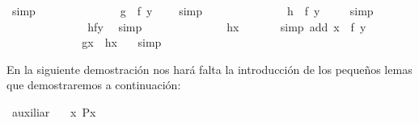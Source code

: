 \begin{isabellebody}
\ simp\isanewline
\ \ \ \ \ \ \ \ \isamarkupfalse%
\ \isamarkupfalse%
\ \ {\isachardoublequoteopen}{\isachardot}{\isachardot}{\isachardot}\ {\isacharequal}\ {\isacharparenleft}g\ {\isasymcirc}\ f{\isacharparenright}\ {\isacharparenleft}y{\isacharparenright}\ \ {\isachardoublequoteclose}\ \isamarkupfalse%
\ simp\isanewline
\ \ \ \ \ \ \ \ \isamarkupfalse%
\ \isamarkupfalse%
\ \ {\isachardoublequoteopen}{\isachardot}{\isachardot}{\isachardot}\ {\isacharequal}\ {\isacharparenleft}h\ {\isasymcirc}\ f{\isacharparenright}\ {\isacharparenleft}y{\isacharparenright}{\isachardoublequoteclose}\ \isamarkupfalse%
\ {}\ \isamarkupfalse%
\ simp\isanewline
\ \ \ \ \ \ \ \ \isamarkupfalse%
\ \isamarkupfalse%
\ \ {\isachardoublequoteopen}{\isachardot}{\isachardot}{\isachardot}\ {\isacharequal}\ h{\isacharparenleft}f{\isacharparenleft}y{\isacharparenright}{\isacharparenright}{\isachardoublequoteclose}\ \isamarkupfalse%
\ simp\isanewline
\ \ \ \ \ \ \ \ \isamarkupfalse%
\ \isamarkupfalse%
\ \ {\isachardoublequoteopen}{\isachardot}{\isachardot}{\isachardot}\ {\isacharequal}\ h{\isacharparenleft}x{\isacharparenright}{\isachardoublequoteclose}\ \isamarkupfalse%
\ {}\ \ \ \isamarkupfalse%
\ {\isacharparenleft}simp\ add{\isacharcolon}\ {\isacartoucheopen}x\ {\isacharequal}\ f\ y{\isacartoucheclose}{\isacharparenright}\isanewline
\ \ \ \ \ \ \ \ \isamarkupfalse%
\ \isamarkupfalse%
\ \ {\isachardoublequoteopen}\ g{\isacharparenleft}x{\isacharparenright}\ {\isacharequal}\ h{\isacharparenleft}x{\isacharparenright}\ {\isachardoublequoteclose}\ \isamarkupfalse%
\ simp\isanewline
\ \ \ \ \ \ \isamarkupfalse%
\isanewline
\ \ \ \ \isamarkupfalse%
\isanewline
\ \ \isamarkupfalse%
\isanewline
{}\isamarkupfalse%
%
\endisatagproof
{\isafoldproof}%
%
\isadelimproof
%
\endisadelimproof
%
\begin{isamarkuptext}%
En la siguiente demostración nos hará falta la introducción de
 los pequeños lemas que demostraremos a continuación:%
\end{isamarkuptext}\isamarkuptrue%
\isamarkupfalse%
\ auxiliar{\isacharunderscore}{}{\isacharcolon}\isanewline
\ \ \ {\isachardoublequoteopen}{\isasymnot}{\isacharparenleft}{\isasymforall}x{\isachardot}\ P{\isacharparenleft}x{\isacharparenright}{\isacharparenright}{\isachardoublequoteclose}\isanewline

\end{isabellebody}
